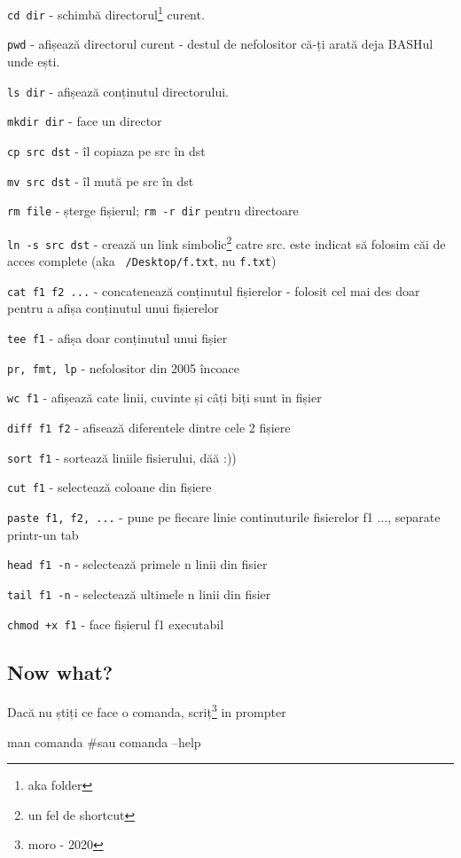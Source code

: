 \documentclass[11pt,a4paper]{article}
\begin{document}
\quad \quad \texttt{cd dir} - schimbă directorul\footnote{aka folder} curent.

\quad \quad \texttt{pwd} - afișează directorul curent - destul de nefolositor că-ți arată deja BASHul unde ești.

\quad \quad \texttt{ls dir} - afișează conținutul directorului.

\quad \quad \texttt{mkdir dir} - face un director

\quad \quad \texttt{cp src dst} - îl copiaza pe src în dst

\quad \quad \texttt{mv src dst} - îl mută pe src în dst

\quad \quad \texttt{rm file} - șterge fișierul; \texttt{rm -r dir} pentru directoare

\quad \quad \texttt{ln -s src dst} - crează un link simbolic\footnote{un fel de shortcut} catre src. este indicat să folosim căi de acces complete
(aka \texttt{~/Desktop/f.txt}, nu \texttt{f.txt})

\quad \quad \texttt{cat f1 f2 ...} - concatenează conținutul fișierelor - folosit cel mai des doar pentru a afișa conținutul unui fișierelor

\quad \quad \texttt{tee f1} - afișa doar conținutul unui fișier

\quad \quad \texttt{pr, fmt, lp} - nefolositor din 2005 încoace

\quad \quad \texttt{wc f1} - afișează cate linii, cuvinte și câți biți sunt in fișier

\quad \quad \texttt{diff f1 f2} - afisează diferentele dintre cele 2 fișiere

\quad \quad \texttt{sort f1} - sortează liniile fisierului, dăă :))

\quad \quad \texttt{cut f1} - selectează coloane din fișiere

\quad \quad \texttt{paste f1, f2, ...} - pune pe fiecare linie continuturile fisierelor f1 ..., separate printr-un tab

\quad \quad \texttt{head f1 -n} - selectează primele n linii din fisier

\quad \quad \texttt{tail f1 -n} - selectează ultimele n linii din fisier


\quad \quad \texttt{chmod +x f1} - face fișierul f1 executabil

\subsection*{Now what?}

Dacă nu știți ce face o comanda, scriț\footnote{moro - 2020} in prompter
\begin{bash}
man comanda
#sau
comanda --help
\end{bash}
\end{document}
